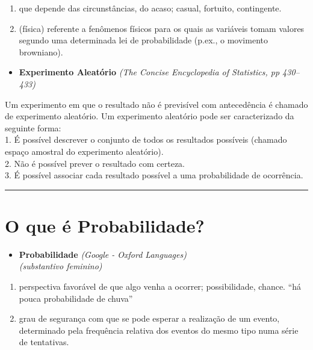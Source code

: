 \documentclass[
]{book}
\providecommand{\tightlist}{%
  \setlength{\itemsep}{0pt}\setlength{\parskip}{0pt}}
\begin{document}
\begin{enumerate}
\def\labelenumi{\arabic{enumi}.}
\tightlist
\item
  que depende das circunstâncias, do acaso; casual, fortuito, contingente.\\
\item
  (física) referente a fenômenos físicos para os quais as variáveis tomam valores segundo uma determinada lei de probabilidade (p.ex., o movimento browniano).
\end{enumerate}

\begin{itemize}
\tightlist
\item
  \textbf{Experimento Aleatório} \emph{(The Concise Encyclopedia of Statistics, pp 430--433)}
\end{itemize}

Um experimento em que o resultado não é previsível com antecedência é chamado de experimento aleatório. Um experimento aleatório pode ser caracterizado da seguinte forma:\\
1. É possível descrever o conjunto de todos os resultados possíveis (chamado espaço amostral do experimento aleatório).\\
2. Não é possível prever o resultado com certeza.\\
3. É possível associar cada resultado possível a uma probabilidade de ocorrência.

\begin{center}\rule{0.5\linewidth}{0.5pt}\end{center}

\section{O que é Probabilidade?}\label{o-que-uxe9-probabilidade}

\begin{itemize}
\tightlist
\item
  \textbf{Probabilidade} \emph{(Google - Oxford Languages)}\\
  \emph{(substantivo feminino)}\\
\end{itemize}

\begin{enumerate}
\def\labelenumi{\arabic{enumi}.}
\tightlist
\item
  perspectiva favorável de que algo venha a ocorrer; possibilidade, chance.
  ``há pouca probabilidade de chuva''\\
\item
  grau de segurança com que se pode esperar a realização de um evento, determinado pela frequência relativa dos eventos do mesmo tipo numa série de tentativas.
\end{enumerate}
\end{document}
